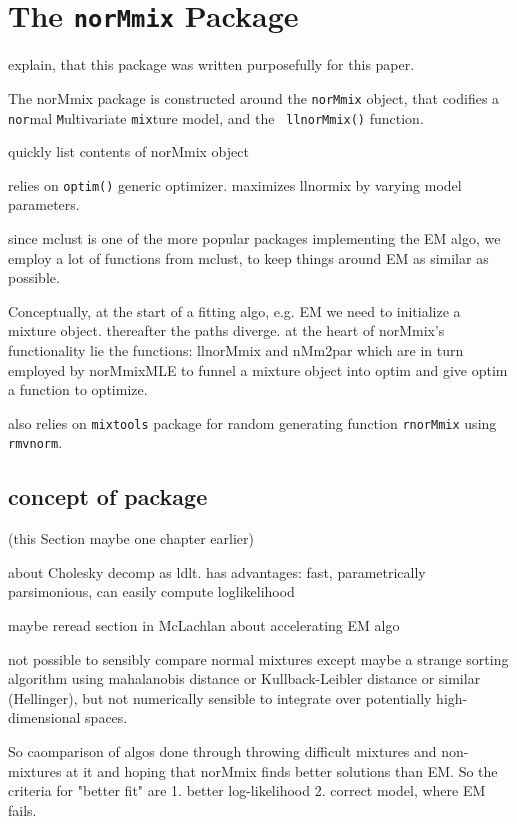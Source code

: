 \chapter{The {\tt norMmix} Package}

explain, that this package was written purposefully for this paper.

The norMmix package is constructed around the {\tt norMmix} object, that 
codifies a {\tt nor}mal {\tt M}ultivariate {\tt mix}ture model,  and the {\tt 
llnorMmix()} function.

quickly list contents of norMmix object

relies on {\tt optim()} generic optimizer. maximizes llnormix by varying model 
parameters.

since mclust is one of the more popular packages implementing the EM algo, we 
employ a lot of functions from mclust, to keep things around EM as similar as 
possible.

Conceptually, at the start of a fitting algo, e.g. EM we need to initialize a
mixture object. %
thereafter the paths diverge. at the heart of norMmix's functionality
lie the functions: llnorMmix and nMm2par which are in turn employed by 
norMmixMLE to funnel a mixture object into optim and give optim a function
to optimize.

also relies on {\tt mixtools} package for random generating function 
{\tt rnorMmix} using {\tt rmvnorm}.

\section{concept of package} (this Section maybe one chapter earlier)

about Cholesky decomp as ldlt. has advantages: fast, parametrically 
parsimonious, can easily compute loglikelihood

maybe reread section in McLachlan about accelerating EM algo

not possible to sensibly compare normal mixtures except maybe a strange sorting 
algorithm using mahalanobis distance or Kullback-Leibler distance or similar
(Hellinger), but not numerically sensible to integrate over potentially 
high-dimensional spaces.

So caomparison of algos done through throwing difficult mixtures and 
non-mixtures at it and hoping that norMmix finds better solutions than EM. So
the criteria for "better fit" are 1. better log-likelihood 2. correct model, 
where EM fails.

